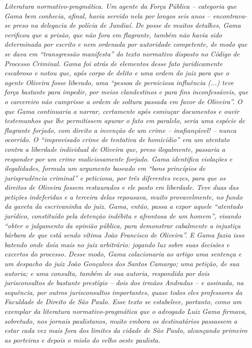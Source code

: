 \begin{didascalia}
\emph{Literatura normativo-pragmática. Um agente da Força Pública --
categoria que Gama bem conhecia, afinal, havia servido nela por longos
seis anos -- encontrava-se preso na delegacia de polícia de Jundiaí. De
posse de muitos detalhes, Gama verificou que a prisão, que não fora em
flagrante, também não havia sido determinada por escrito e nem ordenada
por autoridade competente, de modo que se dava em ``transgressão
manifesta'' do texto normativo disposto no Código de Processo Criminal.
Gama foi atrás de elementos desse fato juridicamente escabroso e notou
que, após corpo de delito e uma ordem do juiz para que o agente Oliveira
fosse liberado, uma ``pessoa de perniciosa influência (...) teve força
bastante para impedir, por meios clandestinos e para fins
inconfessáveis, que o carcereiro não cumprisse a ordem de soltura
passada em favor de Oliveira''. O que Gama continuaria a narrar,
certamente após esmiuçar documentos e ouvir testemunhos que lhe
permitissem apurar o fato em paralelo, seria uma espécie de flagrante
forjado, com direito a invenção de um crime -- inafiançável! -- nunca
ocorrido. O ``improvisado crime de tentativa de homicídio'' era um
atentato contra a liberdade individual de Oliveira que, preso
ilegalmente, passaria a responder por um crime maliciosamente forjado.
Gama identifica violações e ilegalidades, formula um argumento baseado
em ``bons princípios de jurisprudência criminal'' e peticiona, por três
diferentes vezes, para que os direitos de Oliveira fossem restaurados e
ele posto em liberdade. Teve duas das petições indeferidas e a terceira
delas repousava, muito provavelmente, no fundo da gaveta da escrivaninha
do juiz. Gama, então, passa a expor aquele ``atentado jurídico,
constituído pela detenção indébita e afrontosa de um homem'', visando
``obter o julgamento da opinião pública, para demonstrar cabalmente a
injustiça bárbara de que está sendo vítima João Francisco de Oliveira''.
E Gama fazia isso batendo onde doía mais no juiz arbitrário: jogando luz
sobre suas decisões e excertos do processo. Desse modo, Gama
colacionaria ao artigo uma sentença e um despacho do juiz João Gonçalves
dos Santos Camargo; uma petição, de sua autoria; e uma consulta, também
de sua autoria, respondida por dois jurisconsultos de bastante prestígio
-- dois dos irmãos Andradas -- e assinada, na sequência, por outros
jurisconsultos importantes, quase todos eles professores da Faculdade de
Direito de São Paulo. Esse texto se estabelece, portanto, como um
exemplar da literatura normativo-pragmática que o advogado Luiz Gama
firmava, sobretudo, nos jornais paulistanos, muito embora os
destinatários passassem a estar cada vez mais fora dos limites da cidade
de São Paulo, alcançando primeiro as porteiras e depois o miolo do velho
oeste paulista.}
\end{didascalia}

